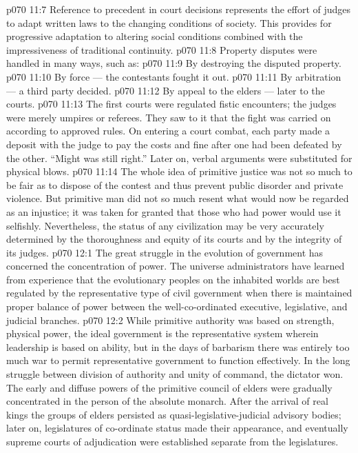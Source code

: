 \vs p070 11:7 Reference to precedent in court decisions represents the effort of judges to adapt written laws to the changing conditions of society. This provides for progressive adaptation to altering social conditions combined with the impressiveness of traditional continuity.
\vs p070 11:8 \pc Property disputes were handled in many ways, such as:
\vs p070 11:9 \bibnobreakspace By destroying the disputed property.
\vs p070 11:10 \bibnobreakspace By force --- the contestants fought it out.
\vs p070 11:11 \bibnobreakspace By arbitration --- a third party decided.
\vs p070 11:12 \bibnobreakspace By appeal to the elders --- later to the courts.
\vs p070 11:13 \pc The first courts were regulated fistic encounters; the judges were merely umpires or referees. They saw to it that the fight was carried on according to approved rules. On entering a court combat, each party made a deposit with the judge to pay the costs and fine after one had been defeated by the other. “Might was still right.” Later on, verbal arguments were substituted for physical blows.
\vs p070 11:14 The whole idea of primitive justice was not so much to be fair as to dispose of the contest and thus prevent public disorder and private violence. But primitive man did not so much resent what would now be regarded as an injustice; it was taken for granted that those who had power would use it selfishly. Nevertheless, the status of any civilization may be very accurately determined by the thoroughness and equity of its courts and by the integrity of its judges.
\vs p070 12:1 The great struggle in the evolution of government has concerned the concentration of power. The universe administrators have learned from experience that the evolutionary peoples on the inhabited worlds are best regulated by the representative type of civil government when there is maintained proper balance of power between the well\hyp{}co\hyp{}ordinated executive, legislative, and judicial branches.
\vs p070 12:2 \pc While primitive authority was based on strength, physical power, the ideal government is the representative system wherein leadership is based on ability, but in the days of barbarism there was entirely too much war to permit representative government to function effectively. In the long struggle between division of authority and unity of command, the dictator won. The early and diffuse powers of the primitive council of elders were gradually concentrated in the person of the absolute monarch. After the arrival of real kings the groups of elders persisted as quasi\hyp{}legislative\hyp{}judicial advisory bodies; later on, legislatures of co\hyp{}ordinate status made their appearance, and eventually supreme courts of adjudication were established separate from the legislatures.
